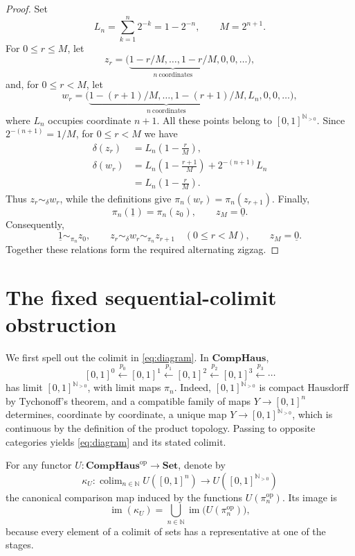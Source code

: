 \documentclass[11pt]{amsart}
\newcommand{\CompHaus}{\mathbf{CompHaus}}
\newcommand{\Set}{\mathbf{Set}}
\newcommand{\N}{\mathbb N}
\newcommand{\op}{\mathrm{op}}
\newcommand{\im}{\operatorname{im}}
\DeclareMathOperator*{\colim}{colim}
\theoremstyle{definition}
\theoremstyle{remark}
\begin{document}
\begin{proof}
Set
\[
  L_n=\sum_{k=1}^n2^{-k}=1-2^{-n},
  \qquad M=2^{n+1}.
\]
For \(0\leq r\leq M\), let
\[
  z_r=
  \bigl(
    \underbrace{1-r/M,\ldots,1-r/M}_{n\ \mathrm{coordinates}},
    0,0,\ldots
  \bigr),
\]
and, for \(0\leq r<M\), let
\[
  w_r=
  \bigl(
    \underbrace{1-(r+1)/M,\ldots,1-(r+1)/M}_{n\ \mathrm{coordinates}},
    L_n,0,0,\ldots
  \bigr),
\]
where \(L_n\) occupies coordinate \(n+1\).  All these points belong to
\([0,1]^{\N_{>0}}\).  Since \(2^{-(n+1)}=1/M\), for \(0\leq r<M\) we have
\[
  \begin{aligned}
  \delta(z_r)
    &=L_n\left(1-\frac rM\right),\\
  \delta(w_r)
    &=L_n\left(1-\frac{r+1}{M}\right)+2^{-(n+1)}L_n\\
    &=L_n\left(1-\frac rM\right).
  \end{aligned}
\]
Thus \(z_r\sim_\delta w_r\), while the definitions give
\(\pi_n(w_r)=\pi_n(z_{r+1})\).  Finally,
\[
  \pi_n(\underline 1)=\pi_n(z_0),
  \qquad z_M=\underline 0.
\]
Consequently,
\[
  \underline 1\sim_{\pi_n}z_0,\qquad
  z_r\sim_\delta w_r\sim_{\pi_n}z_{r+1}
  \quad(0\leq r<M),\qquad
  z_M=\underline 0.
\]
Together these relations form the required alternating zigzag.
\end{proof}

\section{The fixed sequential-colimit obstruction}

We first spell out the colimit in \eqref{eq:diagram}.  In \(\CompHaus\),
\[
  [0,1]^0\xleftarrow{p_0} [0,1]^1\xleftarrow{p_1}[0,1]^2
   \xleftarrow{p_2}[0,1]^3
   \xleftarrow{p_3}\cdots
\]
has limit \([0,1]^{\N_{>0}}\), with limit maps \(\pi_n\).  Indeed,
\([0,1]^{\N_{>0}}\) is
compact Hausdorff by Tychonoff's theorem, and a compatible family of maps
\(Y\to [0,1]^n\) determines, coordinate by coordinate, a unique map
\(Y\to [0,1]^{\N_{>0}}\),
which is continuous by the definition of the product topology.  Passing to
opposite categories yields \eqref{eq:diagram} and its stated colimit.

For any functor \(U\colon\CompHaus^{\op}\to\Set\), denote by
\begin{equation}\label{eq:comparison}
  \kappa_U\colon
  \colim_{n\in\N}U([0,1]^n)\longrightarrow U([0,1]^{\N_{>0}})
\end{equation}
the canonical comparison map induced by the functions
\(U(\pi_n^{\op})\).  Its image is
\[
  \im(\kappa_U)
  =\bigcup_{n\in\N}\im\bigl(U(\pi_n^{\op})\bigr),
\]
because every element of a colimit of sets has a representative at one of
the stages.
\end{document}
